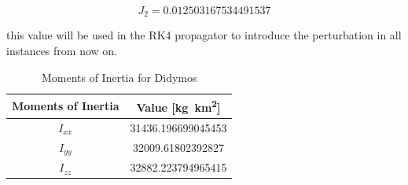 \begin{equation}
	\label{eq:final-j2}
	J_{2} = 0.012503167534491537
\end{equation}

this value will be used in the RK4 propagator to introduce the perturbation in all instances from now on.

\begin{table}[h]
	\centering
	\caption{Moments of Inertia for Didymos}
	\begin{tabular}{c c}
		\toprule
		\textbf{Moments of Inertia} & \textbf{Value [\si{\kilogram \kilo\meter\squared}]} \\
		\midrule
		\textbf{$I_{xx}$}        & 31436.196699045453 \\
		\textbf{$I_{yy}$}       & 32009.61802392827   \\      
		\textbf{$I_{zz}$}       & 32882.223794965415  \\
		\bottomrule
	\end{tabular}
	\label{tab:inertia-didymos}
\end{table}